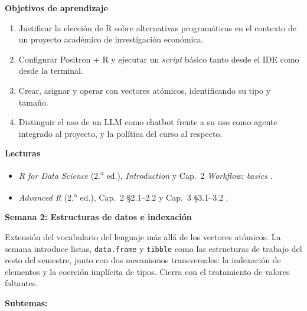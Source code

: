 \documentclass[11pt,letterpaper]{article}
\newcommand{\semana}[2]{%
  \bigskip%
  {\color{main}\Large\bfseries Semana #1: #2\par}%
  \smallskip%
}
\begin{document}
\medskip
\noindent\textbf{Objetivos de aprendizaje}
\begin{enumerate}[leftmargin=*, itemsep=1pt]
    \item Justificar la elección de R sobre alternativas programáticas en el contexto de un proyecto académico de investigación económica.
    \item Configurar Positron + R y ejecutar un \textit{script} básico tanto desde el IDE como desde la terminal.
    \item Crear, asignar y operar con vectores atómicos, identificando su tipo y tamaño.
    \item Distinguir el uso de un LLM como chatbot frente a su uso como agente integrado al proyecto, y la política del curso al respecto.
\end{enumerate}

\noindent\textbf{Lecturas}
\begin{itemize}[leftmargin=*, itemsep=1pt]
    \item \textit{R for Data Science} (2.\textsuperscript{a} ed.), \textit{Introduction} y Cap.\ 2 \textit{Workflow: basics} \cite{wickham2023r4ds}.
    \item \textit{Advanced R} (2.\textsuperscript{a} ed.), Cap.\ 2 §2.1--2.2 y Cap.\ 3 §3.1--3.2 \cite{wickham2019advr}.
\end{itemize}

\semana{2}{Estructuras de datos e indexación}

Extensión del vocabulario del lenguaje más allá de los vectores atómicos. La semana introduce listas, \texttt{data.frame} y \texttt{tibble} como las estructuras de trabajo del resto del semestre, junto con dos mecanismos transversales: la indexación de elementos y la coerción implícita de tipos. Cierra con el tratamiento de valores faltantes.

\textbf{Subtemas:}
\end{document}
